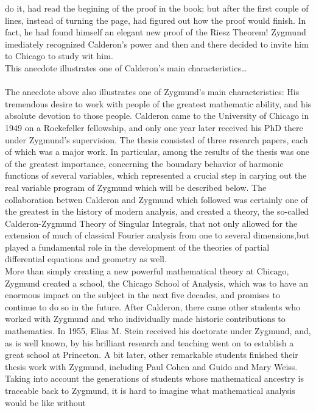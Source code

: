 do it, had read the begining of the proof in the book; but after the first couple of lines, instead of turning 
the page, had figured out how the proof would finish. In fact, he had found himself an elegant new proof of 
the Riesz Theorem! Zygmund imediately recognized Calderon's power and then and there decided to invite him to 
Chicago to study wit him.\\
\indent This anecdote illustrates one of Calderon's main characteristics\dots \\ \\
\noindent The anecdote above also illustrates one of Zygmund's main characteristics: His tremendous desire to 
work with people of the greatest mathematic ability, and his absolute devotion to those people. Calderon 
came to the University of Chicago in 1949 on a Rockefeller fellowship, and only one year later received his 
PhD there under Zygmund's supervision. The thesis consisted of three research papers, each of which was a major 
work. In particular, among the results of the thesis was one of the greatest importance, concerning the boundary 
behavior of harmonic functions of several variables, which represented a crucial step in carying out the real 
variable program of Zygmund which will be described below. The collaboration betwen Calderon and Zygmund which 
followed was certainly one of the greatest in the history of modern analysis, and created a theory, the so-called 
Calderon-Zygmund Theory of Singular Integrals, that not only allowed for the extension of much of classical 
Fourier analysis from one to several dimensions,but played a fundamental role in the development of the theories 
of partial differential equations and geometry as well.\\
\indent More than simply creating a new powerful mathematical theory at Chicago, Zygmund created a school, 
the Chicago School of Analysis, which was to have an enormous impact on the subject in the next five decades, 
and promises to continue to do so in the future. After Calderon, there came other students who worked with 
Zygmund and who individually made historic contributions to mathematics. In 1955, Elias M. Stein received his 
doctorate under Zygmund, and, as is well known, by his brilliant research and teaching went on to establish 
a great school at Princeton. A bit later, other remarkable students finished their thesis work with Zygmund, 
including Paul Cohen and Guido and Mary Weiss. Taking into account the generations of students whose mathematical 
ancestry is traceable back to Zygmund, it is hard to imagine what mathematical analysis would be like without 
